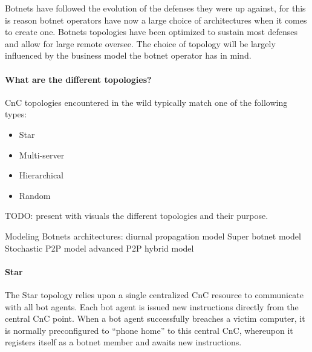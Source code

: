 Botnets have followed the evolution of the defenses they were up against, for this is reason botnet operators have now a large choice of architectures when it comes to create one. Botnets topologies have been optimized to sustain most defenses and allow for large remote oversee. The choice of topology will be largely influenced by the business model the botnet operator has in mind.

\paragraph{What are the different topologies?}
CnC topologies encountered in the wild typically match one of the following types:
\begin{itemize}
\item Star
\item Multi-server
\item Hierarchical
\item Random
\end{itemize}
TODO: present with visuals the different topologies and their purpose.

Modeling Botnets architectures:
diurnal propagation model %
Super botnet model %
Stochastic P2P model %
advanced P2P hybrid model 

\paragraph{Star}
The Star topology relies upon a single centralized CnC resource to communicate with
all bot agents. Each bot agent is issued new instructions directly from the central CnC
point. When a bot agent successfully breaches a victim computer, it is normally
preconfigured to “phone home” to this central CnC, whereupon it registers itself as a
botnet member and awaits new instructions.

